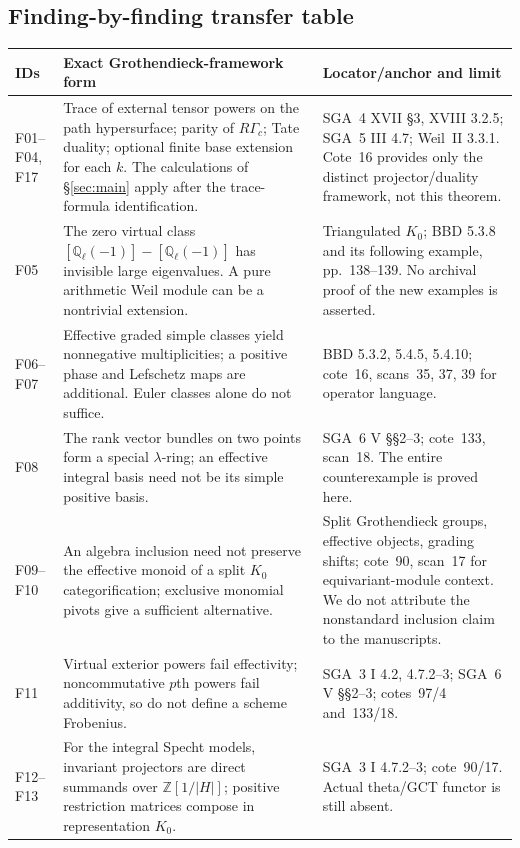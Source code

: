\documentclass[11pt,a4paper]{article}
\newcommand{\Q}{\mathbb Q}\newcommand{\Z}{\mathbb Z}\newcommand{\C}{\mathbb C}\newcommand{\N}{\mathbb N}\newcommand{\F}{\mathbb F}
\theoremstyle{named}\newtheorem{finding}{Finding}[section]
\theoremstyle{definition}\newtheorem{definition}[finding]{Definition}
\theoremstyle{remark}\newtheorem{remark}[finding]{Remark}
\begin{document}
\subsection{Finding-by-finding transfer table}
{\small\begin{longtable}{p{.12\linewidth}p{.48\linewidth}p{.32\linewidth}}
\toprule IDs&Exact Grothendieck-framework form&Locator/anchor and limit\\\midrule\endhead
F01--F04, F17&Trace of external tensor powers on the path hypersurface; parity of $R\Gamma_c$; Tate duality; optional finite base extension for each $k$. The calculations of \S\ref{sec:main} apply after the trace-formula identification.&SGA~4 XVII \S3, XVIII 3.2.5; SGA~5 III 4.7; Weil~II 3.3.1. Cote~16 provides only the distinct projector/duality framework, not this theorem.\\
F05&The zero virtual class $[\Q_\ell(-1)]-[\Q_\ell(-1)]$ has invisible large eigenvalues. A pure arithmetic Weil module can be a nontrivial extension.&Triangulated $K_0$; BBD 5.3.8 and its following example, pp.~138--139. No archival proof of the new examples is asserted.\\
F06--F07&Effective graded simple classes yield nonnegative multiplicities; a positive phase and Lefschetz maps are additional. Euler classes alone do not suffice.&BBD 5.3.2, 5.4.5, 5.4.10; cote~16, scans~35, 37, 39 for operator language.\\
F08&The rank vector bundles on two points form a special $\lambda$-ring; an effective integral basis need not be its simple positive basis.&SGA~6 V \S\S2--3; cote~133, scan~18. The entire counterexample is proved here.\\
F09--F10&An algebra inclusion need not preserve the effective monoid of a split $K_0$ categorification; exclusive monomial pivots give a sufficient alternative.&Split Grothendieck groups, effective objects, grading shifts; cote~90, scan~17 for equivariant-module context. We do not attribute the nonstandard inclusion claim to the manuscripts.\\
F11&Virtual exterior powers fail effectivity; noncommutative $p$th powers fail additivity, so do not define a scheme Frobenius.&SGA~3 I 4.2, 4.7.2--3; SGA~6 V \S\S2--3; cotes~97/4 and~133/18.\\
F12--F13&For the integral Specht models, invariant projectors are direct summands over $\Z[1/|H|]$; positive restriction matrices compose in representation $K_0$.&SGA~3 I 4.7.2--3; cote~90/17. Actual theta/GCT functor is still absent.\\

\end{longtable}}
\end{document}
